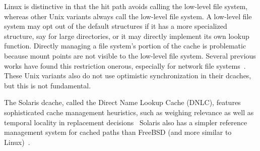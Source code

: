 Linux is distinctive in that the hit path avoids calling the low-level file system,
whereas other Unix variants always call the low-level file system.
A low-level file system may opt out of the default structures if it has a
more specialized structure, say for large directories, or it may 
directly implement its own lookup function.
Directly managing a file system's portion of the cache is problematic 
because mount points are not visible to the low-level file system.
Several previous works have found this restriction onerous, especially for network file systems~\citep{duchamp94nfs}.
These Unix variants also do not use optimistic synchronization in their dcaches,
but this is not fundamental.

The Solaris dcache, called the Direct Name Lookup Cache (DNLC),
features sophisticated cache management heuristics, such as weighing relevance as well as 
temporal locality in replacement decisions~\citep{solarisinternals}
Solaris also has a simpler reference management system for cached paths than FreeBSD (and more similar to Linux)~\citep{freebsd-complexity}.





